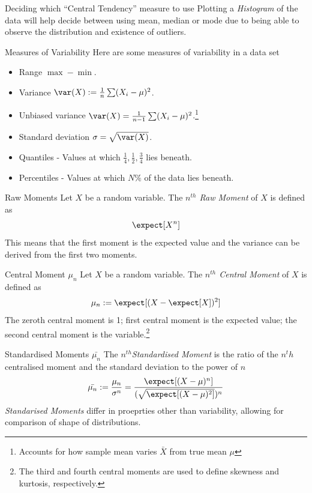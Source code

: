 \documentclass[11pt,a4paper]{article}
\begin{document}
  \begin{remark}{Deciding which ``Central Tendency'' measure to use}
    Plotting a \textit{Histogram} of the data will help decide between using mean, median or mode due to being able to observe the distribution and existence of outliers.
  \end{remark}

  \begin{proposition}{Measures of Variability}\label{def_measures_of_variability}
    Here are some measures of variability in a data set
    \begin{itemize}
      \item Range $\max-\min$.
      \item Variance $\var(X):=\frac1n\sum(X_i-\mu)^2$.
      \item Unbiased variance $\var(X)=\frac1{n-1}\sum(X_i-\mu)^2$.\footnote{Accounts for how sample mean varies $\bar{X}$ from true mean $\mu$}
      \item Standard deviation $\sigma=\sqrt{\var(X)}$.
      \item Quantiles - Values at which $\frac14,\frac12,\frac34$ lies beneath.
      \item Percentiles - Values at which $N\%$ of the data lies beneath.
    \end{itemize}
  \end{proposition}

  \begin{definition}{Raw Moments}
    Let $X$ be a random variable. The \textit{$n^{th}$ Raw Moment} of $X$ is defined as
    \[ \expect[X^n] \]
    This means that the first moment is the expected value and the variance can be derived from the first two moments.
  \end{definition}

  \begin{definition}{Central Moment $\mu_n$}
    Let $X$ be a random variable. The \textit{$n^{th}$ Central Moment} of $X$ is defined as
    \[ \mu_n:=\expect[(X-\expect[X])^2] \]
    The zeroth central moment is 1; first central moment is the expected value; the second central moment is the variable.\footnote{The third and fourth central moments are used to define skewness and kurtosis, respectively.}
  \end{definition}

  \begin{definition}{Standardised Moments $\bar{\mu_n}$}
    The $n^{th}$\textit{Standardised Moment} is the ratio of the $n^th$ centralised moment and the standard deviation to the power of $n$
    \[ \bar{\mu_n}:=\frac{\mu_n}{\sigma^n}=\frac{\expect[(X-\mu)^n]}{(\sqrt{\expect[(X-\mu)^2]})^n} \]
    \textit{Standarised Moments} differ in proeprties other than variability, allowing for comparison of shape of distributions.
  \end{definition}
\end{document}
